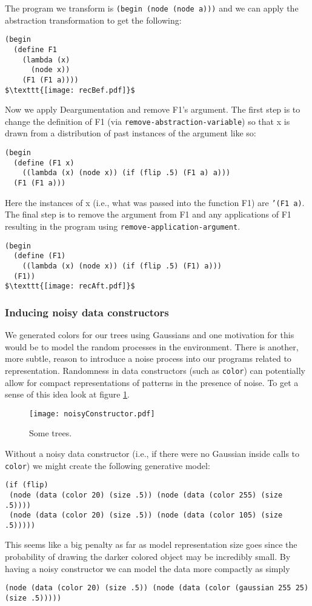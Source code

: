 \documentclass[a4paper,10pt]{article}
\begin{document}
The program we transform is \texttt{(begin (node (node a)))} and we can apply the abstraction transformation to get the following:
\begin{lstlisting}[mathescape=true]
(begin
  (define F1 
    (lambda (x)
      (node x))
    (F1 (F1 a))))
$\texttt{[image: recBef.pdf]}$
\end{lstlisting}

Now we apply Deargumentation and remove F1's argument.  The first step is to change the definition of F1 (via \texttt{remove-abstraction-variable}) so that x is drawn from a distribution of past instances of the argument like so:
\begin{lstlisting}
(begin
  (define (F1 x)
    ((lambda (x) (node x)) (if (flip .5) (F1 a) a)))
  (F1 (F1 a)))
\end{lstlisting}
Here the instances of x (i.e., what was passed into the function F1) are \texttt{'(F1 a)}.   The final step is to remove the argument from F1 and any applications of F1 resulting in the program using \texttt{remove-application-argument}.
\begin{lstlisting}[mathescape=true]
(begin
  (define (F1)
    ((lambda (x) (node x)) (if (flip .5) (F1) a)))
  (F1))
$\texttt{[image: recAft.pdf]}$
\end{lstlisting}


\subsubsection{Inducing noisy data constructors}
We generated colors for our trees using Gaussians and one motivation for this would be to model the random processes in the environment.  There is another, more subtle, reason to introduce a noise process into our programs related to representation.  Randomness in data constructors (such as \texttt{color}) can potentially allow for compact representations of patterns in the presence of noise.  To get a sense of this idea look at figure \ref{fig:noiseCons}. 
\begin{figure}[h]
\begin{center}
\texttt{[image: noisyConstructor.pdf]}
\end{center}
\caption{Some trees.}
\label{fig:noiseCons}
\end{figure}
Without a noisy data constructor (i.e., if there were no Gaussian inside calls to \texttt{color}) we might create the following generative model:
\begin{lstlisting}
(if (flip)
 (node (data (color 20) (size .5)) (node (data (color 255) (size .5))))
 (node (data (color 20) (size .5)) (node (data (color 105) (size .5)))))
\end{lstlisting}
This seems like a big penalty as far as model representation size goes since the probability of drawing the darker colored object may be incredibly small.  By having a noisy constructor we can model the data more compactly as simply 
\begin{lstlisting}
(node (data (color 20) (size .5)) (node (data (color (gaussian 255 25) (size .5)))))
\end{lstlisting}
\end{document}
